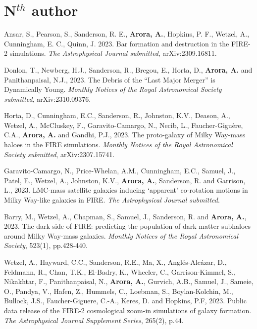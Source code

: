 \documentclass[UTF8]{article}
\begin{document}
\section*{N$^{th}$ author}
\begin{etaremune}

\item Ansar, S., Pearson, S., Sanderson, R. E., \textbf{Arora, A.}, Hopkins, P. F., Wetzel, A., Cunningham, E. C., Quinn, J. 2023. Bar formation and destruction in the FIRE-2 simulations. \textit{The Astrophysical Journal submitted}, arXiv:2309.16811.

\item Donlon, T., Newberg, H.J., Sanderson, R., Bregou, E., Horta, D., \textbf{Arora, A.} and Panithanpaisal, N.J., 2023. The Debris of the ``Last Major Merger'' is Dynamically Young. \textit{Monthly Notices of the Royal Astronomical Society submitted}, arXiv:2310.09376. 

\item Horta, D., Cunningham, E.C., Sanderson, R., Johnston, K.V., Deason, A., Wetzel, A., McCluskey, F., Garavito-Camargo, N., Necib, L., Faucher-Giguère, C.A., \textbf{Arora, A.} and Gandhi, P.J., 2023. The proto-galaxy of Milky Way-mass haloes in the FIRE simulations. \textit{Monthly Notices of the Royal Astronomical Society submitted}, arXiv:2307.15741. 

\item Garavito-Camargo, N., Price-Whelan, A.M.,  Cunningham, E.C., Samuel, J., Patel, E., Wetzel, A., Johnston, K.V., \textbf{Arora, A.}, Sanderson, R. and Garrison, L., 2023. LMC-mass satellite galaxies inducing ‘apparent’ co-rotation motions in Milky Way-like galaxies in
FIRE. \textit{The Astrophysical Journal submitted}.

\item Barry, M., Wetzel, A., Chapman, S., Samuel, J., Sanderson, R. and \textbf{Arora, A.}, 2023. The dark side of FIRE: predicting the population of dark matter subhaloes around Milky Way-mass galaxies. \textit{Monthly Notices of the Royal Astronomical Society}, 523(1), pp.428-440. 

\item Wetzel, A., Hayward, C.C., Sanderson, R.E., Ma, X., Anglés-Alcázar, D., Feldmann, R., Chan, T.K., El-Badry, K., Wheeler, C., Garrison-Kimmel, S., Nikakhtar, F., Panithanpaisal, N., \textbf{Arora, A.}, Gurvich, A.B., Samuel, J., Sameie, O., Pandya, V., Hafen, Z., Hummels, C., Loebman, S., Boylan-Kolchin, M., Bullock, J.S., Faucher-Giguere, C.-A., Keres, D. and Hopkins, P.F, 2023. Public data release of the FIRE-2 cosmological zoom-in simulations of galaxy formation. \textit{The Astrophysical Journal Supplement Series}, 265(2), p.44.



\end{etaremune}
\end{document}
